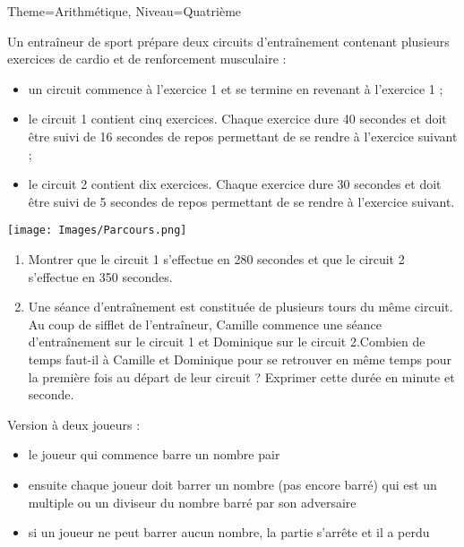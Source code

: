 \documentclass[11pt]{article}
\begin{document}
\begin{multicols}{2}
\begin{Maquette}[Fiche]{Theme=Arithmétique, Niveau=Quatrième}
\begin{exercice}[Source=DNB Juin 2024 Centres étrangers]
    Un entraîneur de sport prépare deux circuits d’entraînement contenant plusieurs exercices de cardio et de renforcement musculaire :
    \begin{itemize}
        \item un circuit commence à l’exercice 1 et se termine en revenant à l’exercice 1 ;
        \item le circuit 1 contient cinq exercices. Chaque exercice dure 40 secondes et doit être suivi de 16 secondes de repos permettant de se rendre à l’exercice suivant ;
        \item le circuit 2 contient dix exercices. Chaque exercice dure 30 secondes et doit être suivi de 5 secondes de repos permettant de se rendre à l’exercice suivant.
    \end{itemize}
    \begin{center}
        \texttt{[image: Images/Parcours.png]}
    \end{center}
    \begin{enumerate}
        \item Montrer que le circuit 1 s’effectue en 280 secondes et que le circuit 2 s’effectue en 350
secondes.
        \item Une séance d’entraînement est constituée de plusieurs tours du même circuit. Au coup de sifflet de l’entraîneur, Camille commence une séance d’entraînement sur le circuit 1 et Dominique sur le circuit 2.Combien de temps faut-il à Camille et Dominique pour se retrouver en même temps pour la première fois au départ de leur circuit ? Exprimer cette durée en minute et seconde.
    \end{enumerate}
\end{exercice}

\columnbreak

\begin{exercice}[Titre=Jeu de Juniper Green]
    Version à deux joueurs :
    \begin{itemize}
        \item le joueur qui commence barre un nombre pair
        \item ensuite chaque joueur doit barrer un nombre (pas encore barré) qui est un multiple ou un diviseur du nombre barré par son adversaire
        \item si un joueur ne peut barrer aucun nombre, la partie s’arrête et il a perdu
    \end{itemize}


\end{exercice}
\end{Maquette}
\end{multicols}
\end{document}
